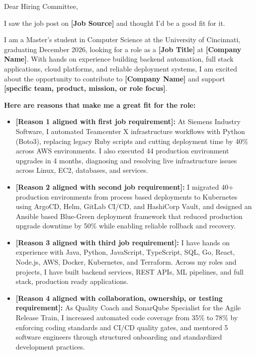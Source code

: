 \documentclass[11pt]{letter}
\date{}
\begin{document}
\begin{letter}{}

\opening{Dear Hiring Committee,}

I saw the job post on \textbf{[Job Source]} and thought I'd be a good fit for it.

I am a Master's student in Computer Science at the University of Cincinnati, graduating December 2026, looking for a role as a \textbf{[Job Title]} at \textbf{[Company Name]}. With hands on experience building backend automation, full stack applications, cloud platforms, and reliable deployment systems, I am excited about the opportunity to contribute to \textbf{[Company Name]} and support \textbf{[specific team, product, mission, or role focus]}.

\textbf{Here are reasons that make me a great fit for the role:}

\begin{itemize}[leftmargin=*, itemsep=0.45em]
    \item \textbf{[Reason 1 aligned with first job requirement]:} At Siemens Industry Software, I automated Teamcenter X infrastructure workflows with Python (Boto3), replacing legacy Ruby scripts and cutting deployment time by 40\% across AWS environments. I also executed 44 production environment upgrades in 4 months, diagnosing and resolving live infrastructure issues across Linux, EC2, databases, and services.

    \item \textbf{[Reason 2 aligned with second job requirement]:} I migrated 40+ production environments from process based deployments to Kubernetes using ArgoCD, Helm, GitLab CI/CD, and HashiCorp Vault, and designed an Ansible based Blue-Green deployment framework that reduced production upgrade downtime by 50\% while enabling reliable rollback and recovery.

    \item \textbf{[Reason 3 aligned with third job requirement]:} I have hands on experience with Java, Python, JavaScript, TypeScript, SQL, Go, React, Node.js, AWS, Docker, Kubernetes, and Terraform. Across my roles and projects, I have built backend services, REST APIs, ML pipelines, and full stack, production ready applications.

    \item \textbf{[Reason 4 aligned with collaboration, ownership, or testing requirement]:} As Quality Coach and SonarQube Specialist for the Agile Release Train, I increased automated code coverage from 35\% to 78\% by enforcing coding standards and CI/CD quality gates, and mentored 5 software engineers through structured onboarding and standardized development practices.
\end{itemize}


\end{letter}
\end{document}
